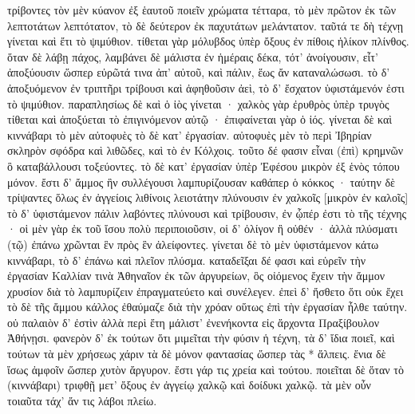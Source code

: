 \documentclass[a4paper, 11pt, oneside, polutonikogreek, german]{article}
\begin{document}
τρίβοντες τὸν μὲν κύανον ἐξ ἑαυτοῦ ποιεῖν χρώματα τέτταρα, τὸ μὲν πρῶτον ἐκ τῶν λεπτοτάτων λεπτότατον, τὸ δὲ δεύτερον ἐκ παχυτάτων μελάντατον. ταῦτά τε δὴ τέχνῃ γίνεται καὶ ἔτι τὸ ψιμύθιον. τίθεται γὰρ μόλυβδος ὑπὲρ ὄξους ἐν πίθοις ἡλίκον πλίνθος. ὅταν δὲ λάβῃ πάχος, λαμβάνει δὲ μάλιστα ἐν ἡμέραις δέκα, τότ' ἀνοίγουσιν, εἶτ' ἀποξύουσιν ὥσπερ εὐρῶτά τινα ἀπ' αὐτοῦ, καὶ πάλιν, ἕως ἄν καταναλώσωσι. τὸ δ' ἀποξυόμενον ἐν τριπτῆρι τρίβουσι καὶ ἀφηθοῦσιν ἀεὶ, τὸ δ' ἔσχατον ὑφιστάμενόν ἐστι τὸ ψιμύθιον. παραπλησίως δὲ καὶ ὁ ἰὸς γίνεται · χαλκὸς γὰρ ἐρυθρὸς ὑπὲρ τρυγὸς τίθεται καὶ ἀποξύεται τὸ ἐπιγινόμενον αὐτῷ · ἐπιφαίνεται γὰρ ὁ ἰός. γίνεται δὲ καὶ κιννάβαρι τὸ μὲν αὐτοφυὲς τὸ δὲ κατ' ἐργασίαν. αὐτοφυὲς μὲν τὸ περὶ Ἰβηρίαν σκληρὸν σφόδρα καὶ λιθῶδες, καὶ τὸ ἐν Κόλχοις. τοῦτο δέ φασιν εἶναι (ἐπὶ) κρημνῶν ὃ καταβάλλουσι τοξεύοντες. τὸ δὲ κατ' ἐργασίαν ὑπὲρ Ἐφέσου μικρὸν ἐξ ἑνὸς τόπου μόνον. ἔστι δ' ἄμμος ἣν συλλέγουσι λαμπυρίζουσαν καθάπερ ὁ κόκκος · ταύτην δὲ τρίψαντες ὅλως ἐν ἀγγείοις λιθίνοις λειοτάτην πλύνουσιν ἐν χαλκοῖς [μικρὸν ἐν καλοῖς] τὸ δ' ὑφιστάμενον πάλιν λαβόντες πλύνουσι καὶ τρίβουσιν, ἐν ᾧπέρ ἐστι τὸ τῆς τέχνης · οἱ μὲν γὰρ ἐκ τοῦ ἴσου πολὺ περιποιοῦσιν, οἱ δ' ὀλίγον ἢ οὐθέν · ἀλλὰ πλύσματι (τῷ) ἐπάνω χρῶνται ἓν πρὸς ἓν ἀλείφοντες. γίνεται δὲ τὸ μὲν ὑφιστάμενον κάτω κιννάβαρι, τὸ δ' ἐπάνω καὶ πλεῖον πλύσμα. καταδεῖξαι δέ φασι καὶ εὑρεῖν τὴν ἐργασίαν Καλλίαν τινὰ Ἀθηναῖον ἐκ τῶν ἀργυρείων, ὃς οἰόμενος ἔχειν τὴν ἄμμον χρυσίον διὰ τὸ λαμπυρίζειν ἐπραγματεύετο καὶ συνέλεγεν. ἐπεὶ δ' ἤσθετο ὅτι οὐκ ἔχει τὸ δὲ τῆς ἄμμου κάλλος ἐθαύμαζε διὰ τὴν χρόαν οὕτως ἐπὶ τὴν ἐργασίαν ἦλθε ταύτην. οὐ παλαιὸν δ' ἐστὶν ἀλλὰ περὶ ἔτη μάλιστ' ἐνενήκοντα εἰς ἄρχοντα Πραξίβουλον Ἀθήνῃσι. φανερὸν δ' ἐκ τούτων ὅτι μιμεῖται τὴν φύσιν ἡ τέχνη, τὰ δ' ἴδια ποιεῖ, καὶ τούτων τὰ μὲν χρήσεως χάριν τὰ δὲ μόνον φαντασίας ὥσπερ τὰς * ἄλπεις. ἔνια δὲ ἴσως ἀμφοῖν ὥσπερ χυτὸν ἄργυρον. ἔστι γάρ τις χρεία καὶ τούτου. ποιεῖται δὲ ὅταν τὸ (κιννάβαρι) τριφθῇ μετ' ὄξους ἐν ἀγγείῳ χαλκῷ καὶ δοίδυκι χαλκῷ. τὰ μὲν οὖν τοιαῦτα τάχ' ἄν τις λάβοι πλείω.
\end{document}

